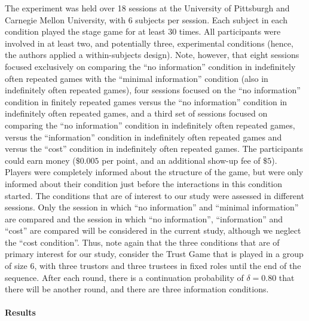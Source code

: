 \documentclass[
  11pt,
]{article}
\begin{document}
The experiment was held over 18 sessions at the University of Pittsburgh and Carnegie Mellon University, with 6 subjects per session. Each subject in each condition played the stage game for at least 30 times. All participants were involved in at least two, and potentially three, experimental conditions (hence, the authors applied a within-subjects design). Note, however, that eight sessions focused exclusively on comparing the ``no information'' condition in indefinitely often repeated games with the ``minimal information'' condition (also in indefinitely often repeated games), four sessions focused on the ``no information'' condition in finitely repeated games versus the ``no information'' condition in indefinitely often repeated games, and a third set of sessions focused on comparing the ``no information'' condition in indefinitely often repeated games, versus the ``information'' condition in indefinitely often repeated games and versus the ``cost'' condition in indefinitely often repeated games. The participants could earn money (\(\$0.005\) per point, and an additional show-up fee of \(\$5\)). Players were completely informed about the structure of the game, but were only informed about their condition just before the interactions in this condition started.
The conditions that are of interest to our study were assessed in different sessions.
Only the session in which ``no information'' and ``minimal information'' are compared and the session in which ``no information'', ``information'' and ``cost'' are compared will be considered in the current study, although we neglect the ``cost condition''. Thus, note again that the three conditions that are of primary interest for our study, consider the Trust Game that is played in a group of size 6, with three trustors and three trustees in fixed roles until the end of the sequence. After each round, there is a continuation probability of \(\delta = 0.80\) that there will be another round, and there are three information conditions.

\hypertarget{results-2}{%
\paragraph{Results}\label{results-2}}
\end{document}
